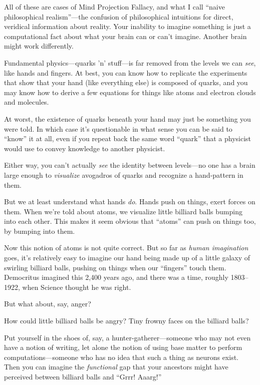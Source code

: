 {
 All of these are cases of Mind Projection Fallacy, and what I call
``naive philosophical
realism''---the confusion of philosophical intuitions
for direct, veridical information about reality. Your inability to
imagine something is just a computational fact about what your brain
can or can't imagine. Another brain might work
differently.}

\myendsectiontext


{
 Fundamental physics---quarks 'n'
stuff---is far removed from the levels we can \textit{see}, like hands
and fingers. At best, you can know how to replicate the experiments
that show that your hand (like everything else) is composed of quarks,
and you may know how to derive a few equations for things like atoms
and electron clouds and molecules. }

{
 At worst, the existence of quarks beneath your hand may just be
something you were told. In which case it's
questionable in what sense you can be said to
``know'' it at all, even if you
repeat back the same word ``quark''
that a physicist would use to convey knowledge to another physicist.}

{
 Either way, you can't actually \textit{see} the
identity between levels---no one has a brain large enough to
\textit{visualize} avogadros of quarks and recognize a hand-pattern in
them.}

{
 But we at least understand what hands \textit{do}. Hands push on
things, exert forces on them. When we're told about
atoms, we visualize little billiard balls bumping into each other. This
makes it seem obvious that ``atoms''
can push on things too, by bumping into them.}

{
 Now this notion of atoms is not quite correct. But so far as
\textit{human imagination} goes, it's relatively easy
to imagine our hand being made up of a little galaxy of swirling
billiard balls, pushing on things when our
``fingers'' touch them. Democritus
imagined this 2,400 years ago, and there was a time, roughly
1803--1922, when Science thought he was right.}

{
 But what about, say, anger?}

{
 How could little billiard balls be angry? Tiny frowny faces on the
billiard balls?}

{
 Put yourself in the shoes of, say, a hunter-gatherer---someone who
may not even have a notion of writing, let alone the notion of using
base matter to perform computations---someone who has no idea that such
a thing as neurons exist. Then you can imagine the \textit{functional}
gap that your ancestors might have perceived between billiard balls and
``Grrr! Aaarg!''}

